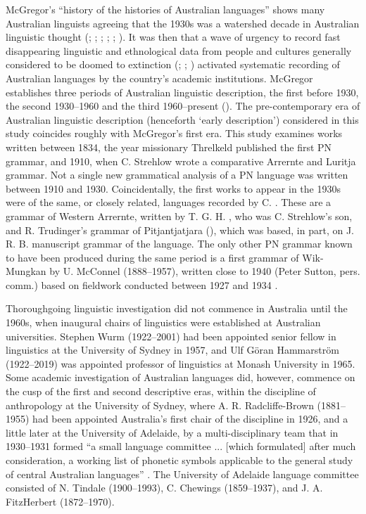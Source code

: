 McGregor’s \citeyearpar[2--13]{mcgregor_introduction_2008} “history of the histories of Australian languages” shows many Australian linguists agreeing that the 1930s was a watershed decade in Australian linguistic thought (\citealt{ogrady_languages_1966}; \citealt{capell_history_1970}; \citealt{capell_1972}; \citealt{dixon_languages_1980}; \citealt{blake_australian_1981}; \citealt{blake_introduction_1991}). It was then that a wave of urgency to record fast disappearing linguistic and ethnological data from people and cultures generally considered to be doomed to extinction (\citealt[325]{haeckel_history_1876}; \citealt[28]{harris_one_1994}; \citealt[21]{anderson_miserablest_2007}) activated systematic recording of Australian languages by the country’s academic institutions. McGregor establishes three periods of Australian linguistic description, the first before 1930, the second 1930--1960 and the third 1960--present (\citeyear[9--20]{mcgregor_introduction_2008}). The pre-contemporary era of Australian linguistic description (henceforth `early description') considered in this study coincides roughly with McGregor’s first era. This study examines works written between 1834, the year missionary Threlkeld published the first PN grammar, and 1910, when C. Strehlow wrote a comparative Arrernte and Luritja grammar. Not a single new grammatical analysis of a PN language was written between 1910 and 1930. Coincidentally, the first works to appear in the 1930s were of the same, or closely related, languages recorded by C. \citet{strehlow_notitle_1910}. These are a grammar of Western Arrernte, written by T. G. H. \citet{strehlow_aranda_1944}, who was C. Strehlow’s son, and R. Trudinger’s grammar of Pitjantjatjara (\citeyear{trudinger_grammar_1943}), which was based, in part, on J. R. B.  manuscript grammar of the language. The only other PN grammar known to have been produced during the same period is  a first grammar of Wik-Mungkan by U. McConnel (1888--1957), written close to 1940 (Peter Sutton, pers. comm.) based on fieldwork conducted between 1927 and 1934 \citep{sutton_explorations_nodate}.

Thoroughgoing linguistic investigation did not commence in Australia until the 1960s, when inaugural chairs of linguistics were established at Australian universities. Stephen Wurm (1922–2001) had been appointed senior fellow in linguistics at the University of Sydney in 1957, and Ulf Göran Hammarström (1922–2019) was appointed professor of linguistics at Monash University in 1965. Some academic investigation of Australian languages did, however, commence on the cusp of the first and second descriptive eras, within the discipline of anthropology at the University of Sydney, where A. R. Radcliffe-Brown (1881–1955) had been appointed Australia’s first chair of the discipline in 1926, and a little later at the University of Adelaide, by a multi-disciplinary team that in 1930--1931 formed “a small language committee ... [which formulated] after much consideration, a working list of phonetic symbols applicable to the general study of central Australian languages” \citep[261]{tindale_legend_1935}. The University of Adelaide language committee consisted of N. Tindale (1900--1993), C. Chewings (1859--1937), and J. A. FitzHerbert (1872–1970).

